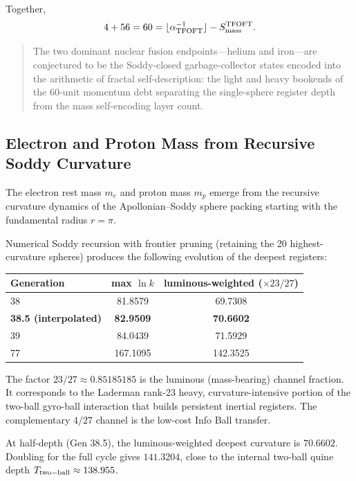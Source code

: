 \documentclass[11pt,a4paper]{article}
\begin{document}
Together,
\[
4+56=60
=
\lfloor\alpha_{\rm TFOFT}^{-1}\rfloor
-
S_{\rm mass}^{\rm TFOFT}.
\]

\begin{quote}
The two dominant nuclear fusion endpoints---helium and iron---are conjectured
to be the Soddy-closed garbage-collector states encoded into the arithmetic of
fractal self-description: the light and heavy bookends of the 60-unit momentum
debt separating the single-sphere register depth from the mass self-encoding
layer count.
\end{quote}



\subsection{Electron and Proton Mass from Recursive Soddy Curvature}

The electron rest mass \(m_e\) and proton mass \(m_p\) emerge from the recursive curvature dynamics of the Apollonian--Soddy sphere packing starting with the fundamental radius \(r = \pi\).

Numerical Soddy recursion with frontier pruning (retaining the 20 highest-curvature spheres) produces the following evolution of the deepest registers:

\begin{center}
\begin{tabular}{lcc}
\toprule
Generation & max \(\ln k\) & luminous-weighted (\(\times 23/27\)) \\
\midrule
38     & 81.8579 & 69.7308 \\
\textbf{38.5 (interpolated)} & \textbf{82.9509} & \textbf{70.6602} \\
39     & 84.0439 & 71.5929 \\
77     & 167.1095 & 142.3525 \\
\bottomrule
\end{tabular}
\end{center}

The factor \(23/27 \approx 0.85185185\) is the luminous (mass-bearing) channel fraction. It corresponds to the Laderman rank-23 heavy, curvature-intensive portion of the two-ball gyro-ball interaction that builds persistent inertial registers. The complementary \(4/27\) channel is the low-cost Info Ball transfer.

At half-depth (Gen 38.5), the luminous-weighted deepest curvature is \(70.6602\). Doubling for the full cycle gives \(141.3204\), close to the internal two-ball quine depth \(T_{\rm two-ball} \approx 138.955\).
\end{document}

